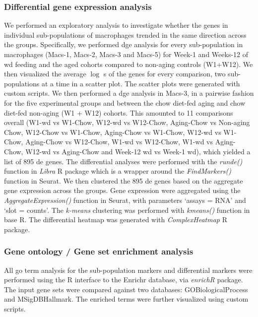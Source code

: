 \subsubsection{\large Differential gene expression analysis}
\label{subsubsec:met_chp2_dge}


We performed an exploratory analysis to investigate whether the genes in individual sub-populations of macrophages trended in the same direction across the groups. Specifically, we performed \gls{dge} analysis for every sub-population in macrophages (Macs-1, Macs-2, Macs-3 and Macs-5) for Week-1 and Weeks-12 of \gls{wd} feeding and the aged cohorts compared to non-aging controls (W1+W12). We then visualized the average $\log$ s of the genes for every comparison, two sub-populations at a time in a scatter plot. The scatter plots were generated with custom scripts. We then performed a \gls{dge} analysis in Macs-3, in a pairwise fashion for the five experimental groups and between the chow diet-fed aging and chow diet-fed non-aging (W1 + W12) cohorts. This amounted to 11 comparisons overall (W1-\gls{wd} vs W1-Chow, W12-\gls{wd} vs W12-Chow, Aging-Chow vs Non-aging Chow, W12-Chow vs W1-Chow, Aging-Chow vs W1-Chow, W12-\gls{wd} vs W1-Chow, Aging-Chow vs W12-Chow, W1-\gls{wd} vs W12-Chow, W1-\gls{wd} vs Aging-Chow, W12-\gls{wd} vs Aging-Chow and Week-12 \gls{wd} vs Week-1 \gls{wd}), which yielded a list of 895 \gls{de} genes. The differential analyses were performed with the \textit{run\textunderscore de()} function in \textit{Libra} R package \textbf{\cite{noauthor_libra_2024}} which is a wrapper around the \textit{FindMarkers()} function in Seurat. We then clustered the 895 \gls{de} genes based on the aggregate gene expression across the groups. Gene expression were aggregated using the \textit{AggregateExpression()} function in Seurat, with parameters `assays = RNA' and `slot = counts'. The \textit{k-means} clustering was performed with \textit{kmeans()} function in base R. The differential heatmap was generated with \textit{ComplexHeatmap} R package.


\subsubsection{\large Gene ontology / Gene set enrichment analysis}
\label{subsubsec:met_chp2_gogsea}
All \gls{go} term analysis for the sub-population markers and differential markers were performed using the R interface to the Enrichr database, via \textit{enrichR} package. The input gene sets were compared against two databases: GO\textunderscore Biological\textunderscore Process and MSigDB\textunderscore Hallmark. The enriched terms were further visualized using custom scripts.

